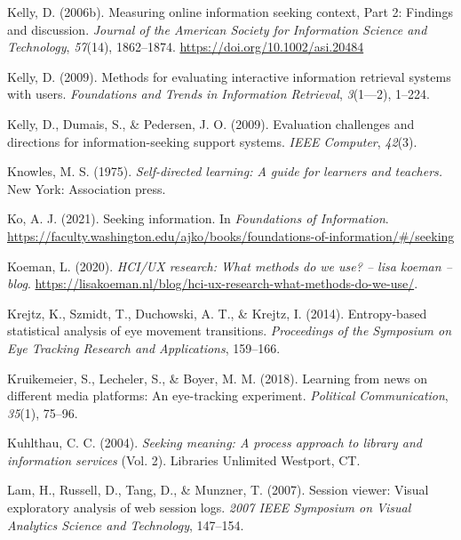 \documentclass[letterpaper, nobind]{templates/ociamthesis}
\newlength{\cslhangindent}
\newenvironment{CSLReferences}[2] %
 {%
  \setlength{\parindent}{0pt}
  \ifodd #1
  \let\oldpar\par
  \def\par{\hangindent=\cslhangindent\oldpar}
  \fi
  \setlength{\parskip}{1mm}
  \setlength{\baselineskip}{6mm}
 }%
 {}
\begin{document}
\begin{CSLReferences}{1}{0}
\leavevmode{}%
Kelly, D. (2006b). Measuring online information seeking context, {Part} 2: Findings and discussion. \emph{Journal of the American Society for Information Science and Technology}, \emph{57}(14), 1862--1874. \url{https://doi.org/10.1002/asi.20484}

\leavevmode{}%
Kelly, D. (2009). Methods for evaluating interactive information retrieval systems with users. \emph{Foundations and Trends in Information Retrieval}, \emph{3}(1---2), 1--224.

\leavevmode{}%
Kelly, D., Dumais, S., \& Pedersen, J. O. (2009). Evaluation challenges and directions for information-seeking support systems. \emph{IEEE Computer}, \emph{42}(3).

\leavevmode{}%
Knowles, M. S. (1975). \emph{Self-directed learning: A guide for learners and teachers.} New York: Association press.

\leavevmode{}%
Ko, A. J. (2021). Seeking information. In \emph{Foundations of {Information}}. \url{https://faculty.washington.edu/ajko/books/foundations-of-information/\#/seeking}

\leavevmode{}%
Koeman, L. (2020). \emph{HCI/UX research: What methods do we use? -- lisa koeman -- blog}. \url{https://lisakoeman.nl/blog/hci-ux-research-what-methods-do-we-use/}.

\leavevmode{}%
Krejtz, K., Szmidt, T., Duchowski, A. T., \& Krejtz, I. (2014). Entropy-based statistical analysis of eye movement transitions. \emph{Proceedings of the Symposium on Eye Tracking Research and Applications}, 159--166.

\leavevmode{}%
Kruikemeier, S., Lecheler, S., \& Boyer, M. M. (2018). Learning from news on different media platforms: An eye-tracking experiment. \emph{Political Communication}, \emph{35}(1), 75--96.

\leavevmode{}%
Kuhlthau, C. C. (2004). \emph{Seeking meaning: A process approach to library and information services} (Vol. 2). Libraries Unlimited Westport, CT.

\leavevmode{}%
Lam, H., Russell, D., Tang, D., \& Munzner, T. (2007). Session viewer: Visual exploratory analysis of web session logs. \emph{2007 IEEE Symposium on Visual Analytics Science and Technology}, 147--154.


\end{CSLReferences}
\end{document}
